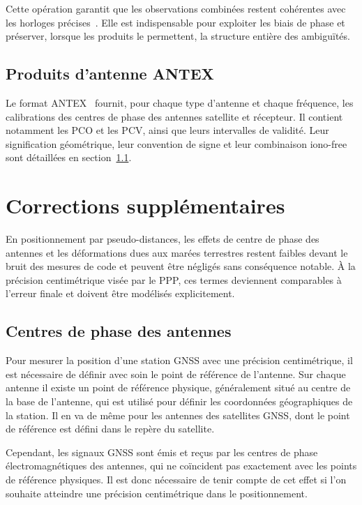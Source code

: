Cette opération garantit que les observations combinées restent cohérentes
avec les horloges précises~\cite{banville2020}. Elle est indispensable pour exploiter les biais de
phase et préserver, lorsque les produits le permettent, la structure entière
des ambiguïtés.

\subsection{Produits d'antenne ANTEX}

Le format ANTEX~\cite{antexFormat} fournit, pour chaque type d'antenne et chaque fréquence, les
calibrations des centres de phase des antennes satellite et récepteur. Il
contient notamment les PCO et les PCV, ainsi que leurs intervalles de validité.
Leur signification géométrique, leur convention de signe et leur combinaison
iono-free sont détaillées en
section~\ref{sec:antenna_corrections}.

\section{Corrections supplémentaires}
\label{sec:corrections_supplementaires}

En positionnement par pseudo-distances, les effets de centre de phase des antennes et les déformations dues aux marées terrestres restent faibles devant le bruit des mesures de code et peuvent être négligés sans conséquence notable. À la précision centimétrique visée par le PPP, ces termes deviennent comparables à l'erreur finale et doivent être modélisés explicitement.

\subsection{Centres de phase des antennes}\label{sec:antenna_corrections}


Pour mesurer la position d'une station GNSS avec une précision centimétrique,
il est nécessaire de définir avec soin le point de référence de l'antenne.
Sur chaque antenne il existe un point de référence physique, généralement situé au centre de la base de l'antenne, qui est utilisé pour définir les coordonnées géographiques de la station.
Il en va de même pour les antennes des satellites GNSS, dont le point de référence est défini dans le repère du satellite.

Cependant, les signaux GNSS sont émis et reçus par les centres de phase électromagnétiques des antennes, qui ne coïncident pas exactement avec les points de référence physiques.
Il est donc nécessaire de tenir compte de cet effet si l'on souhaite atteindre une précision centimétrique dans le positionnement.

